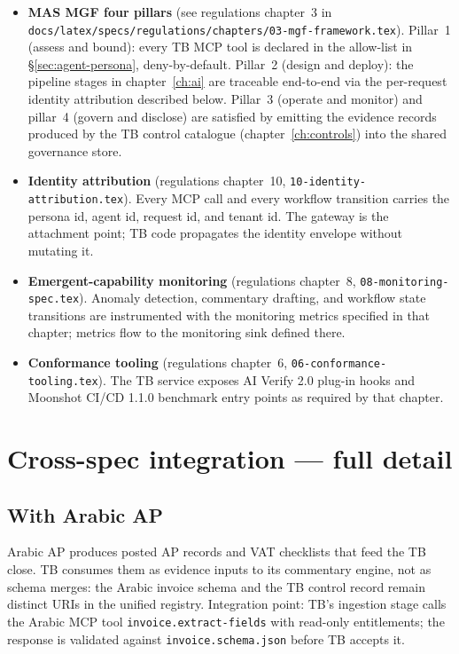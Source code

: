 \documentclass[11pt,a4paper,twoside]{report}
\begin{document}
\begin{itemize}
\item \textbf{MAS MGF four pillars} (see regulations
chapter~3 in
\texttt{docs/latex/specs/regulations/chapters/03-mgf-framework.tex}).
Pillar~1 (assess and bound): every TB MCP tool is declared in the
allow-list in \S\ref{sec:agent-persona}, deny-by-default.
Pillar~2 (design and deploy): the pipeline stages in
chapter~\ref{ch:ai} are traceable end-to-end via the per-request
identity attribution described below. Pillar~3 (operate and
monitor) and pillar~4 (govern and disclose) are satisfied by
emitting the evidence records produced by the TB control
catalogue (chapter~\ref{ch:controls}) into the shared governance
store.
\item \textbf{Identity attribution} (regulations chapter~10,
\texttt{10-identity-attribution.tex}). Every MCP call and every
workflow transition carries the persona id, agent id, request id,
and tenant id. The gateway is the attachment point; TB code
propagates the identity envelope without mutating it.
\item \textbf{Emergent-capability monitoring} (regulations
chapter~8, \texttt{08-monitoring-spec.tex}). Anomaly detection,
commentary drafting, and workflow state transitions are
instrumented with the monitoring metrics specified in that
chapter; metrics flow to the monitoring sink defined there.
\item \textbf{Conformance tooling} (regulations chapter~6,
\texttt{06-conformance-tooling.tex}). The TB service exposes
AI Verify 2.0 plug-in hooks and Moonshot CI/CD 1.1.0 benchmark
entry points as required by that chapter.
\end{itemize}

\section{Cross-spec integration --- full detail}
\label{sec:agent-integration}

\subsection{With Arabic AP}
Arabic AP produces posted AP records and VAT checklists that feed
the TB close. TB consumes them as evidence inputs to its commentary
engine, not as schema merges: the Arabic invoice schema and the TB
control record remain distinct URIs in the unified registry.
Integration point: TB's ingestion stage calls the Arabic MCP tool
\texttt{invoice.extract-fields} with read-only entitlements; the
response is validated against \texttt{invoice.schema.json} before TB
accepts it.
\end{document}
